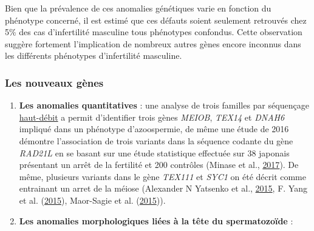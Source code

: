 \documentclass[12pt,twoside]{reedthesis}
\theoremstyle{definition}
\theoremstyle{definition}
\theoremstyle{remark}
\begin{document}
  Bien que la prévalence de ces anomalies génétiques varie en fonction du
  phénotype concerné, il est estimé que ces défauts soient seulement
  retrouvés chez 5\% des cas d'infertilité masculine tous phénotypes
  confondus. Cette observation suggère fortement l'implication de nombreux
  autres gènes encore inconnus dans les différents phénotypes
  d'infertilité masculine.
  
  \newpage
  
  \subsubsection{Les nouveaux gènes}\label{les-nouveaux-genes}
  
  \begin{enumerate}
  \def\labelenumi{\arabic{enumi}.}
  \item
    \textbf{Les anomalies quantitatives} : une analyse de trois familles
    par séquençage \protect\hyperlink{ngs}{haut-débit} a permit
    d'identifier trois gènes \emph{MEIOB}, \emph{TEX14} et \emph{DNAH6}
    impliqué dans un phénotype d'azoospermie, de même une étude de 2016
    démontre l'association de trois variants dans la séquence codante du
    gène \emph{RAD21L} en se basant sur une étude statistique effectuée
    sur 38 japonais présentant un arrêt de la fertilité et 200 contrôles
    (Minase et al., \protect\hyperlink{ref-Minase2017}{2017}). De même,
    plusieurs variants dans le gène \emph{TEX111} et \emph{SYC1} on été
    décrit comme entrainant un arret de la méiose (Alexander N Yatsenko et
    al., \protect\hyperlink{ref-Yatsenko2015}{2015}, F. Yang et al.
    (\protect\hyperlink{ref-Yang2015}{2015}), Maor-Sagie et al.
    (\protect\hyperlink{ref-Maor-Sagie2015}{2015})).
  \item
    \textbf{Les anomalies morphologiques liées à la tête du spermatozoïde}
    :
  

\end{enumerate}
\end{document}
